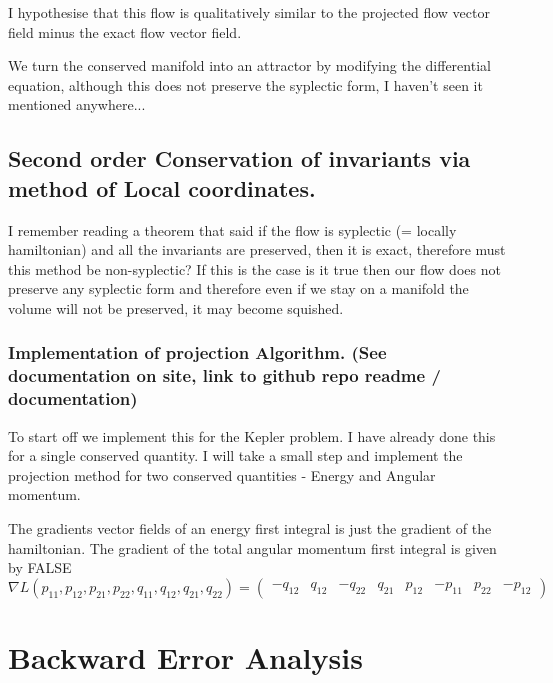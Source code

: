 \documentclass[12pt]{article}
\begin{document}
I hypothesise that this flow is qualitatively similar to the projected flow vector field minus the exact flow vector field.

We turn the conserved manifold into an attractor by modifying the differential equation, although this does not preserve the syplectic form, I haven't seen it mentioned anywhere...

\subsection{Second order Conservation of invariants via method of Local coordinates.}

I remember reading a theorem that said if the flow is syplectic (= locally hamiltonian) and all the invariants are preserved, then it is exact, therefore must this method be non-syplectic? If this is the case is it true then our flow does not preserve any syplectic form and therefore even if we stay on a manifold the volume will not be preserved, it may become squished. 


\subsubsection{Implementation of projection Algorithm. (See documentation on site, link to github repo readme / documentation)}

To start off we implement this for the Kepler problem. I have already done this for a single conserved quantity. I will take a small step and implement the projection method for two conserved quantities - Energy and Angular momentum. 

The gradients vector fields of an energy first integral is just the gradient of the hamiltonian. The gradient of the total angular momentum first integral is given by 
FALSE
\begin{equation}\label{eq:first integral gradient total angular momentum}
    \nabla L(p_{11},p_{12},p_{21},p_{22},q_{11},q_{12},q_{21},q_{22}) = \begin{pmatrix} -q_{12} & q_{12} & -q_{22} & q_{21} & p_{12} & -p_{11} & p_{22} & -p_{12} \end{pmatrix}
\end{equation}



\section{Backward Error Analysis}
\end{document}
